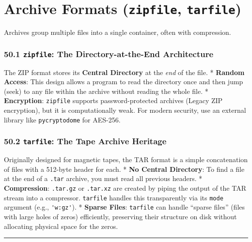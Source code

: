 \hypertarget{archive-formats-zipfile-tarfile}{%
\chapter{\texorpdfstring{Archive Formats (\texttt{zipfile},
\texttt{tarfile})}{Archive Formats (zipfile, tarfile)}}\label{archive-formats-zipfile-tarfile}}

Archives group multiple files into a single container, often with
compression.

\hypertarget{zipfile-the-directory-at-the-end-architecture}{%
\subsection{\texorpdfstring{50.1 \texttt{zipfile}: The
Directory-at-the-End
Architecture}{50.1 zipfile: The Directory-at-the-End Architecture}}\label{zipfile-the-directory-at-the-end-architecture}}

The ZIP format stores its \textbf{Central Directory} at the \emph{end}
of the file. * \textbf{Random Access}: This design allows a program to
read the directory once and then jump (seek) to any file within the
archive without reading the whole file. * \textbf{Encryption}:
\passthrough{\lstinline!zipfile!} supports password-protected archives
(Legacy ZIP encryption), but it is computationally weak. For modern
security, use an external library like
\passthrough{\lstinline!pycryptodome!} for AES-256.

\hypertarget{tarfile-the-tape-archive-heritage}{%
\subsection{\texorpdfstring{50.2 \texttt{tarfile}: The Tape Archive
Heritage}{50.2 tarfile: The Tape Archive Heritage}}\label{tarfile-the-tape-archive-heritage}}

Originally designed for magnetic tapes, the TAR format is a simple
concatenation of files with a 512-byte header for each. * \textbf{No
Central Directory}: To find a file at the end of a
\passthrough{\lstinline!.tar!} archive, you must read all previous
headers. * \textbf{Compression}: \passthrough{\lstinline!.tar.gz!} or
\passthrough{\lstinline!.tar.xz!} are created by piping the output of
the TAR stream into a compressor. \passthrough{\lstinline!tarfile!}
handles this transparently via its \passthrough{\lstinline!mode!}
argument (e.g., \passthrough{\lstinline!'w:gz'!}). * \textbf{Sparse
Files}: \passthrough{\lstinline!tarfile!} can handle ``sparse files''
(files with large holes of zeros) efficiently, preserving their
structure on disk without allocating physical space for the zeros.

\begin{center}\rule{0.5\linewidth}{0.5pt}\end{center}
